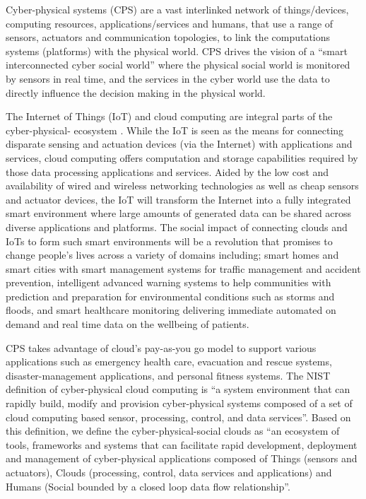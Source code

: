 
\setcounter{section}{0}
\setcounter{figure}{0}
\graphicspath{{./figs/}{./figs/item-rajiv/}}



Cyber-physical systems (CPS) are a vast interlinked network of things/devices, computing resources, applications/services and humans, that use a range of sensors, actuators and communication topologies,
to link the computations systems (platforms) with the physical world.
CPS drives the vision of a ``smart interconnected cyber social world'' where the physical social world is monitored by sensors in real time,
and the services in the cyber world use the data to directly influence the decision making in the physical world.

The Internet of Things (IoT) and cloud computing are integral parts of the cyber-physical- ecosystem \cite{ref4}.
While the IoT is seen as the means for connecting disparate sensing and actuation devices (via the Internet) with applications and services,
cloud computing offers computation and storage capabilities required by those data processing applications and services.
Aided by the low cost and availability of wired and wireless networking technologies as well as cheap sensors and actuator devices,
the IoT will transform the Internet into a fully integrated smart environment where large amounts of generated data can be shared across diverse applications and platforms.
The social impact of connecting clouds and IoTs to form such smart environments will be a revolution that promises to change people's lives across a variety of domains including;
smart homes and smart cities with smart management systems for traffic management and accident prevention,
intelligent advanced warning systems to help communities with prediction and preparation for environmental conditions such as storms and floods,
and smart healthcare monitoring delivering immediate automated on demand and real time data on the wellbeing of patients. 

CPS takes advantage of cloud's pay-as-you go model to support various applications such as emergency health care, evacuation and rescue systems, disaster-management applications, and personal fitness systems.
The NIST definition \cite{ref1} of cyber-physical cloud computing is
``a system environment that can rapidly build, modify and provision cyber-physical systems composed of a set of cloud computing based sensor, processing, control, and data services''.
Based on this definition, we define the cyber-physical-social clouds as ``an ecosystem of tools, frameworks and systems that can facilitate rapid development, deployment and management of cyber-physical applications composed of Things (sensors and actuators), Clouds (processing, control, data services and applications) and Humans (Social bounded by a closed loop data flow relationship''. 

